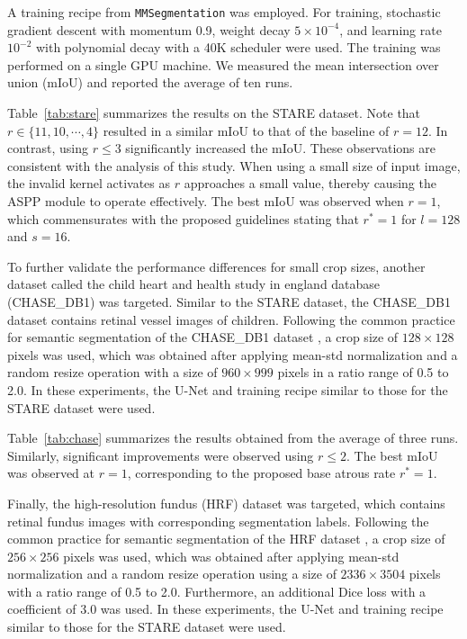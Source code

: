 \documentclass{article}
\def\tabref#1{Table~\ref{#1}}
\begin{document}
A training recipe from \texttt{MMSegmentation} \citep{mmseg2020} was employed. For training, stochastic gradient descent with momentum 0.9, weight decay $5 \times 10^{-4}$, and learning rate $10^{-2}$ with polynomial decay with a 40K scheduler were used. The training was performed on a single GPU machine. We measured the mean intersection over union (mIoU) and reported the average of ten runs.

\tabref{tab:stare} summarizes the results on the STARE dataset. Note that $r \in \{11, 10, \cdots, 4\}$ resulted in a similar mIoU to that of the baseline of $r=12$. In contrast, using $r \leq 3$ significantly increased the mIoU. These observations are consistent with the analysis of this study. When using a small size of input image, the invalid kernel activates as $r$ approaches a small value, thereby causing the ASPP module to operate effectively. The best mIoU was observed when $r=1$, which commensurates with the proposed guidelines stating that $r^*=1$ for $l=128$ and $s=16$.

To further validate the performance differences for small crop sizes, another dataset called the child heart and health study in england database (CHASE\_DB1) \citep{DBLP:journals/tbe/FrazRHUROB12} was targeted. Similar to the STARE dataset, the CHASE\_DB1 dataset contains retinal vessel images of children. Following the common practice for semantic segmentation of the CHASE\_DB1 dataset \citep{DBLP:journals/tbe/YanYC18}, a crop size of $128 \times 128$ pixels was used, which was obtained after applying mean-std normalization and a random resize operation with a size of $960 \times 999$ pixels in a ratio range of 0.5 to 2.0. In these experiments, the U-Net and training recipe similar to those for the STARE dataset were used.

\tabref{tab:chase} summarizes the results obtained from the average of three runs. Similarly, significant improvements were observed using $r \leq 2$. The best mIoU was observed at $r=1$, corresponding to the proposed base atrous rate $r^*=1$.

Finally, the high-resolution fundus (HRF) dataset \citep{DBLP:journals/ijbi/BudaiBMHM13} was targeted, which contains retinal fundus images with corresponding segmentation labels. Following the common practice for semantic segmentation of the HRF dataset \citep{DBLP:conf/midl/BreaJ0W20}, a crop size of $256 \times 256$ pixels was used, which was obtained after applying mean-std normalization and a random resize operation using a size of $2336 \times 3504$ pixels with a ratio range of 0.5 to 2.0. Furthermore, an additional Dice loss with a coefficient of 3.0 was used. In these experiments, the U-Net and training recipe similar to those for the STARE dataset were used.
\end{document}
